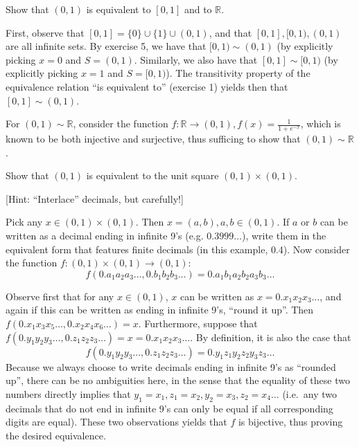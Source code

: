 \begin{exercise}{8}
    Show that $(0, 1)$ is equivalent to $[0, 1]$ and to $\mathbb{R}$.
\end{exercise}

\begin{solution}

    First, observe that $[0, 1] = \{0\} \cup \{1\} \cup (0, 1)$, and that $[0, 1], [0, 1), (0, 1)$ are all infinite sets.
    By exercise 5, we have that $[0, 1) \sim (0, 1)$ (by explicitly picking $x = 0$ and $S = (0, 1)$.
    Similarly, we also have that $[0, 1] \sim [0, 1)$ (by explicitly picking $x = 1$ and $S = [0, 1)$).
    The transitivity property of the equivalence relation ``is equivalent to'' (exercise 1) yields then that $[0, 1] \sim (0, 1)$.

    For $(0, 1) \sim \mathbb{R}$, consider the function $f: \mathbb{R} \rightarrow (0, 1), f(x) = \frac{1}{1 + e^{-x}}$, which is known to be both injective and surjective, thus sufficing to show that $(0, 1) \sim \mathbb{R}$.
\end{solution}

\begin{exercise}{9}
    Show that $(0, 1)$ is equivalent to the unit square $(0, 1) \times (0, 1)$.

    [Hint: ``Interlace'' decimals, but carefully!]
\end{exercise}

\begin{solution}

    Pick any $x \in (0, 1) \times (0, 1)$. 
    Then $x = (a, b), a, b \in (0, 1)$. 
    If $a$ or $b$ can be written as a decimal ending in infinite 9's (e.g. $0.3999\ldots$), write them in the equivalent form that features finite decimals (in this example, 0.4).
    Now consider the function $f: (0, 1) \times (0, 1) \rightarrow (0, 1)$:
    $$f(0.a_1a_2a_3\ldots, 0.b_1b_2b_3\ldots) = 0.a_1b_1a_2b_2a_3b_3\ldots$$
     
    Observe first that for any $x \in (0, 1)$, $x$ can be written as $x = 0.x_1x_2x_3\ldots$, and again if this can be written as ending in infinite 9's, ``round it up''. 
    Then $f(0.x_1x_3x_5\ldots, 0.x_2x_4x_6\ldots) = x$. 
    Furthermore, suppose that $f(0.y_1y_2y_3\ldots, 0.z_1z_2z_3\ldots) = x = 0.x_1x_2x_3\ldots$. 
    By definition, it is also the case that 
    $$f(0.y_1y_2y_3\ldots, 0.z_1z_2z_3\ldots) = 0.y_1z_1y_2z_2y_3z_3\ldots$$
    Because we always choose to write decimals ending in infinite 9's as ``rounded up'', there can be no ambiguities here, in the sense that the equality of these two numbers directly implies that $y_1 = x_1, z_1 = x_2, y_2 = x_3, z_2 = x_4 \ldots$ (i.e.\, any two decimals that do not end in infinite 9's can only be equal if all corresponding digits are equal).
    These two observations yields that $f$ is bijective, thus proving the desired equivalence.
\end{solution}

